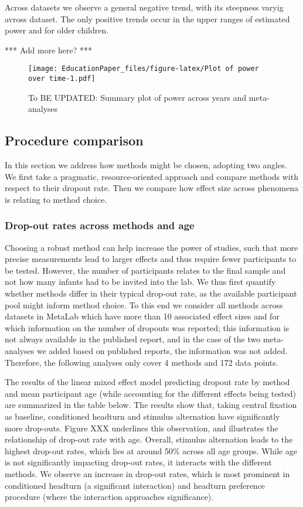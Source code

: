 \documentclass[english,floatsintext,man]{apa6}
\begin{document}
Across datasets we observe a general negative trend, with its steepness
varyig avross dataset. The only positive trends occur in the upper
ranges of estimated power and for older children.

*** Add more here? ***

\begin{figure}[htbp]
\centering
\texttt{[image: EducationPaper\_files/figure-latex/Plot of power over time-1.pdf]}
\caption{To BE UPDATED: Summary plot of power across years and
meta-analyses}
\end{figure}

\subsection{Procedure comparison}\label{procedure-comparison}

In this section we address how methods might be chosen, adopting two
angles. We first take a pragmatic, resource-oriented approach and
compare methods with respect to their dropout rate. Then we compare how
effect size across phenomena is relating to method choice.

\subsubsection{Drop-out rates across methods and
age}\label{drop-out-rates-across-methods-and-age}

Choosing a robust method can help increase the power of studies, such
that more precise measurements lead to larger effects and thus require
fewer participants to be tested. However, the number of participants
relates to the final sample and not how many infants had to be invited
into the lab. We thus first quantify whether methods differ in their
typical drop-out rate, as the available participant pool might inform
method choice. To this end we consider all methods across datasets in
MetaLab which have more than 10 associated effect sizes and for which
information on the number of dropouts was reported; this information is
not always available in the published report, and in the case of the two
meta-analyses we added based on published reports, the information was
not added. Therefore, the following analyses only cover 4 methods and
172 data points.

The results of the linear mixed effect model predicting dropout rate by
method and mean participant age (while accounting for the different
effects being tested) are summarized in the table below. The results
show that, taking central fixation as baseline, conditioned headturn and
stimulus alternation have significantly more drop-outs. Figure XXX
underlines this observation, and illustrates the relationship of
drop-out rate with age. Overall, stimulus alternation leads to the
highest drop-out rates, which lies at around 50\% across all age groups.
While age is not significantly impacting drop-out rates, it interacts
with the different methods. We observe an increase in drop-out rates,
which is most prominent in conditioned headturn (a significant
interaction) and headturn preference procedure (where the interaction
approaches significance).
\end{document}
